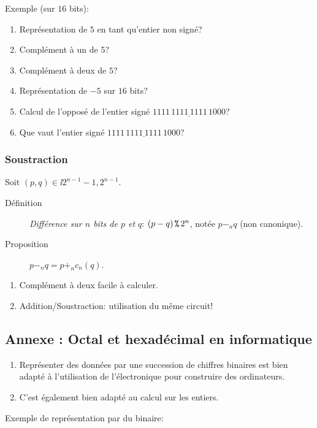 Exemple (sur $16$ bits):
\begin{enumerate}
\item Représentation  de $5$ en tant qu'entier non signé?
\item Complément à un de $5$?
\item Complément à deux de $5$?
\item Représentation de $-5$ sur $16$ bits?
\item Calcul de l'opposé de l'entier signé $\underline{1111\,1111\,1111\,1000}$?
\item Que vaut l'entier signé $\underline{1111\,1111\,1111\,1000}$?
\end{enumerate}

\subsubsection{Soustraction}

Soit $(p,q)\in\ii{2^{n-1}-1,2^{n-1}}$.
\begin{description}
\item[Définition] \emph{Différence sur $n$ bits de $p$ et $q$}: $(p-
  q)\operatorname{\texttt{\%}} 2^{n}$, notée $p-_{n}q$ (non canonique).
\item[Proposition] $p -_{n} q = p +_{n} c_{n}(q)$.
\end{description}

\begin{enumerate}
\item Complément à deux facile à calculer.
\item Addition/Soustraction: utilisation du même circuit!
\end{enumerate}


\subsection{Annexe : Octal et hexadécimal en informatique}

\begin{enumerate}
\item Représenter des données par une succession de chiffres binaires
  est bien adapté à l'utilisation de l'électronique pour construire des
  ordinateurs.
\item C'est également bien adapté au calcul sur les entiers.
\end{enumerate}

Exemple de représentation par du binaire:

